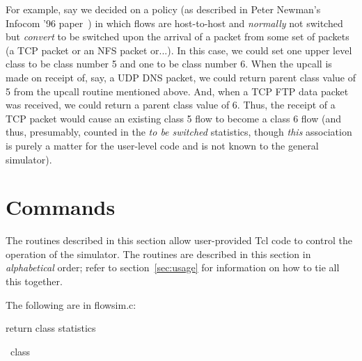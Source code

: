\documentclass{article}
\begin{document}
For example, say we decided on a policy (as described
in Peter Newman's Infocom '96 paper~\cite{xxx}) in which flows are
host-to-host and \emph{normally} not switched but \emph{convert} to be
switched upon the arrival of a packet from some set of packets (a TCP
packet or an NFS packet or...).  In this case, we could set one upper
level class to be class number 5 and one to be class number 6.  When
the upcall is made on receipt of, say, a UDP DNS packet, we could
return parent class value of 5 from the upcall routine mentioned above.
And, when a TCP FTP data packet was received, we could return a parent
class value of 6.  Thus, the receipt of a TCP packet would cause an
existing class 5 flow to become a class 6 flow (and thus, presumably,
counted in the \emph{to be switched} statistics, though \emph{this}
association is purely a matter for the user-level code and is not known
to the general simulator).

\section{Commands}
The routines described in this section allow user-provided Tcl code to
control the operation of the simulator.  The routines are described in
this section in \emph{alphabetical} order; refer to
section~\ref{sec:usage} for information on how to tie all this
together.

The following are in flowsim.c:

\clearpage
{} {return class statistics}

\SYNOPSIS \cmdname\ class

\DESCRIPTION
\end{document}
